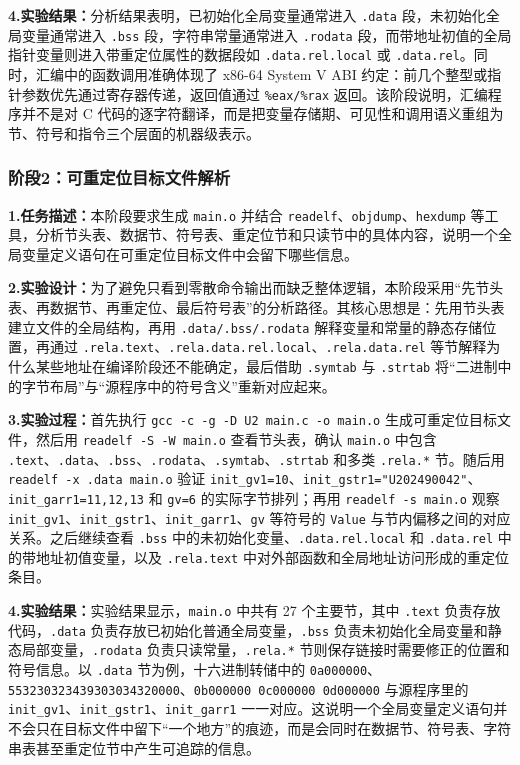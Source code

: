 \documentclass[supercite]{Experimental_Report}
\theoremstyle{definition}
\begin{document}
\noindent\textbf{4.实验结果：}分析结果表明，已初始化全局变量通常进入 \texttt{.data} 段，未初始化全局变量通常进入 \texttt{.bss} 段，字符串常量通常进入 \texttt{.rodata} 段，而带地址初值的全局指针变量则进入带重定位属性的数据段如 \texttt{.data.rel.local} 或 \texttt{.data.rel}。同时，汇编中的函数调用准确体现了 x86-64 System V ABI 约定：前几个整型或指针参数优先通过寄存器传递，返回值通过 \texttt{\%eax/\%rax} 返回。该阶段说明，汇编程序并不是对 C 代码的逐字符翻译，而是把变量存储期、可见性和调用语义重组为节、符号和指令三个层面的机器级表示。

\subsubsection{阶段2：可重定位目标文件解析}
\noindent\textbf{1.任务描述：}本阶段要求生成 \texttt{main.o} 并结合 \texttt{readelf}、\texttt{objdump}、\texttt{hexdump} 等工具，分析节头表、数据节、符号表、重定位节和只读节中的具体内容，说明一个全局变量定义语句在可重定位目标文件中会留下哪些信息。

\noindent\textbf{2.实验设计：}为了避免只看到零散命令输出而缺乏整体逻辑，本阶段采用“先节头表、再数据节、再重定位、最后符号表”的分析路径。其核心思想是：先用节头表建立文件的全局结构，再用 \texttt{.data/.bss/.rodata} 解释变量和常量的静态存储位置，再通过 \texttt{.rela.text}、\texttt{.rela.data.rel.local}、\texttt{.rela.data.rel} 等节解释为什么某些地址在编译阶段还不能确定，最后借助 \texttt{.symtab} 与 \texttt{.strtab} 将“二进制中的字节布局”与“源程序中的符号含义”重新对应起来。

\noindent\textbf{3.实验过程：}首先执行 \texttt{gcc -c -g -D U2 main.c -o main.o} 生成可重定位目标文件，然后用 \texttt{readelf -S -W main.o} 查看节头表，确认 \texttt{main.o} 中包含 \texttt{.text}、\texttt{.data}、\texttt{.bss}、\texttt{.rodata}、\texttt{.symtab}、\texttt{.strtab} 和多类 \texttt{.rela.*} 节。随后用 \texttt{readelf -x .data main.o} 验证 \texttt{init\_gv1=10}、\texttt{init\_gstr1="U202490042"}、\texttt{init\_garr1={11,12,13}} 和 \texttt{gv=6} 的实际字节排列；再用 \texttt{readelf -s main.o} 观察 \texttt{init\_gv1}、\texttt{init\_gstr1}、\texttt{init\_garr1}、\texttt{gv} 等符号的 \texttt{Value} 与节内偏移之间的对应关系。之后继续查看 \texttt{.bss} 中的未初始化变量、\texttt{.data.rel.local} 和 \texttt{.data.rel} 中的带地址初值变量，以及 \texttt{.rela.text} 中对外部函数和全局地址访问形成的重定位条目。

\noindent\textbf{4.实验结果：}实验结果显示，\texttt{main.o} 中共有 27 个主要节，其中 \texttt{.text} 负责存放代码，\texttt{.data} 负责存放已初始化普通全局变量，\texttt{.bss} 负责未初始化全局变量和静态局部变量，\texttt{.rodata} 负责只读常量，\texttt{.rela.*} 节则保存链接时需要修正的位置和符号信息。以 \texttt{.data} 节为例，十六进制转储中的 \texttt{0a000000}、\texttt{553230323439303034320000}、\texttt{0b000000 0c000000 0d000000} 与源程序里的 \texttt{init\_gv1}、\texttt{init\_gstr1}、\texttt{init\_garr1} 一一对应。这说明一个全局变量定义语句并不会只在目标文件中留下“一个地方”的痕迹，而是会同时在数据节、符号表、字符串表甚至重定位节中产生可追踪的信息。
\end{document}
